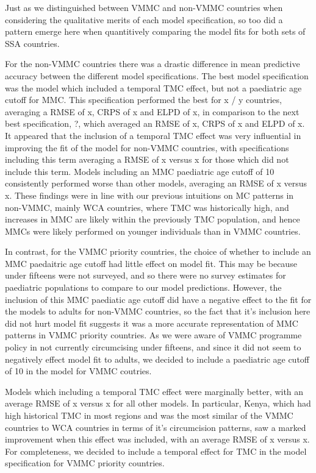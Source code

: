\documentclass[a4paper, 12pt]{article}
\begin{document}
Just as we distinguished between VMMC and non-VMMC countries when considering the qualitative merits of each model specification, so too did a pattern emerge here when quantitively comparing the model fits for both sets of SSA countries. 

For the non-VMMC countries there was a drastic difference in mean predictive accuracy between the different model specifications.
The best model specification was the model which included a temporal TMC effect, but not a paediatric age cutoff for MMC.
This specification performed the best for x / y countries, averaging a RMSE of x, CRPS of x and ELPD of x, in comparison to the next best specification, ?, which averaged an RMSE of x, CRPS of x and ELPD of x. 
It appeared that the inclusion of a temporal TMC effect was very influential in improving the fit of the model for non-VMMC countries, with specifications including this term averaging a RMSE of x versus x for those which did not include this term.
Models including an MMC paediatric age cutoff of 10 consistently performed worse than other models, averaging an RMSE of x versus x. 
These findings were in line with our previous intuitions on MC patterns in non-VMMC, mainly WCA countries, where TMC was historically high, and increases in MMC are likely within the previously TMC population, and hence MMCs were likely performed on younger individuals than in VMMC countries. 

In contrast, for the VMMC priority countries, the choice of whether to include an MMC paedaitric age cutoff had little effect on model fit.
This may be because under fifteens were not surveyed, and so there were no survey estimates for paediatric populations to compare to our model predictions.
However, the inclusion of this MMC paediatic age cutoff did have a negative effect to the fit for the models to adults for non-VMMC countries, so the fact that it's inclusion here did not hurt model fit suggests it was a more accurate representation of MMC patterns in VMMC priority countries.
As we were aware of VMMC programme policy in not currently circumcising under fifteens, and since it did not seem to negatively effect model fit to adults, we decided to include a paediatric age cutoff of 10 in the model for VMMC coutries. 

Models which including a temporal TMC effect were marginally better, with an average RMSE of x versus x for all other models.
In particular, Kenya, which had high historical TMC in most regions and was the most similar of the VMMC countries to WCA countries in terms of it's circumcision patterns, saw a marked improvement when this effect was included, with an average RMSE of x versus x. For completeness, we decided to include a temporal effect for TMC in the model specification for VMMC priority countries.
\end{document}
